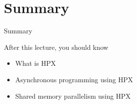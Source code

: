 \documentclass[\classoption]{beamer}
\begin{document}
\section{Summary}
\begin{frame}{Summary}
\begin{block}{After this lecture, you should know}
\begin{itemize}
\item What is HPX
\item Asynchronous programming using HPX
\item Shared memory parallelism using HPX
\end{itemize}
\end{block}
\end{frame}
\end{document}
